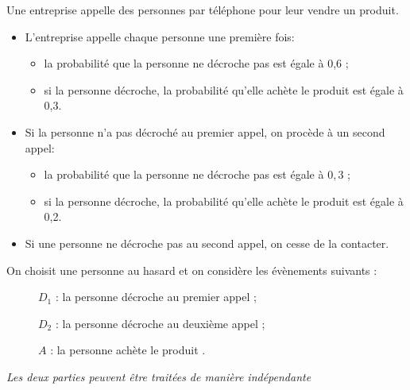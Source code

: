 \medskip

Une entreprise appelle des personnes par téléphone pour leur vendre un produit. 

\begin{itemize}
\item L'entreprise appelle chaque personne une première fois:
\begin{itemize}
\item[$\bullet~~$]la probabilité que la personne ne décroche pas est égale à 0,6 ;
\item[$\bullet~~$]si la personne décroche, la probabilité qu'elle achète le produit est égale à 0,3.
\end{itemize}
\item Si la personne n'a pas décroché au premier appel, on procède à un second appel: 
\begin{itemize}
\item[$\bullet~~$]la probabilité que la personne ne décroche pas est égale à $0,3$ ;
\item[$\bullet~~$]si la personne décroche, la probabilité qu'elle achète le produit est égale à 0,2.
\end{itemize}
\item Si une personne ne décroche pas au second appel, on cesse de la contacter.
\end{itemize}

\medskip

On choisit une personne au hasard et on considère les évènements suivants : 

\begin{description}
\item[ ] $D_1$ : \og la personne décroche au premier appel\fg{} ;
\item[ ] $D_2$ : \og la personne décroche au deuxième appel\fg{} ;
\item[ ] $A$ : \og la personne achète le produit \fg.
\end{description}

\begin{center}\emph{Les deux parties peuvent être traitées de manière indépendante}\end{center}

